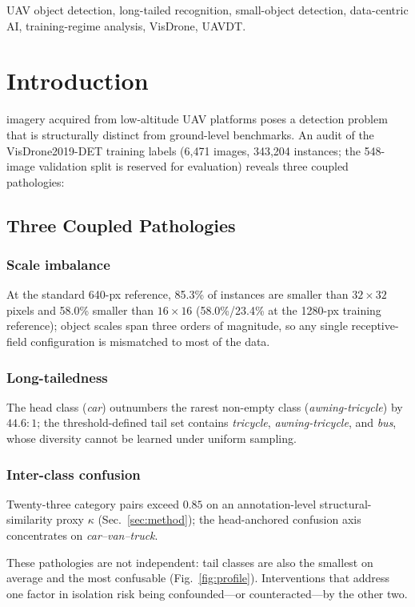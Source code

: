 \documentclass[journal]{IEEEtran}
\newcommand{\visdrone}{VisDrone2019-DET}
\begin{document}
\begin{IEEEkeywords}
UAV object detection, long-tailed recognition, small-object detection, data-centric AI, training-regime analysis, VisDrone, UAVDT.
\end{IEEEkeywords}

\section{Introduction}
 imagery acquired from low-altitude UAV platforms poses a detection problem that is structurally distinct from ground-level benchmarks. An audit of the \visdrone{} training labels (6{,}471 images, 343{,}204 instances; the 548-image validation split is reserved for evaluation) reveals three coupled pathologies:

\subsection{Three Coupled Pathologies}

\subsubsection{Scale imbalance} At the standard 640-px reference, 85.3\% of instances are smaller than $32{\times}32$ pixels and 58.0\% smaller than $16{\times}16$ (58.0\%/23.4\% at the 1280-px training reference); object scales span three orders of magnitude, so any single receptive-field configuration is mismatched to most of the data.

\subsubsection{Long-tailedness} The head class (\emph{car}) outnumbers the rarest non-empty class (\emph{awning-tricycle}) by $44.6{:}1$; the threshold-defined tail set contains \emph{tricycle}, \emph{awning-tricycle}, and \emph{bus}, whose diversity cannot be learned under uniform sampling.

\subsubsection{Inter-class confusion} Twenty-three category pairs exceed $0.85$ on an annotation-level structural-similarity proxy $\kappa$ (Sec.~\ref{sec:method}); the head-anchored confusion axis concentrates on \emph{car--van--truck}.

These pathologies are not independent: tail classes are also the smallest on average and the most confusable (Fig.~\ref{fig:profile}). Interventions that address one factor in isolation risk being confounded---or counteracted---by the other two.
\end{document}
